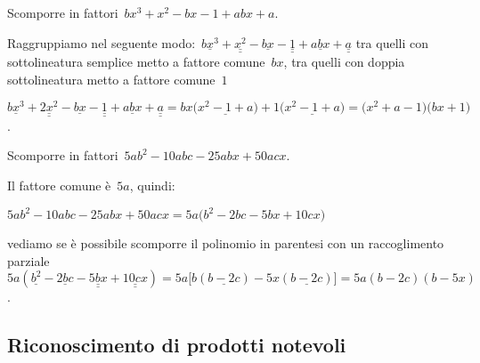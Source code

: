  \begin{esempio}
Scomporre in fattori~\(bx^{3}+x^{2}-bx-1+abx+a\).
 \begin{enumeratea}
  \item Raggruppiamo nel seguente 
   modo:~\(\underline{bx^{3}}+\underline{\underline {x^{2}}}-\underline{bx}-
          \underline{\underline{1}}+\underline{abx}+\underline{\underline{a}}\) 
   tra quelli con sottolineatura semplice metto a fattore comune~\(bx\), 
   tra quelli con doppia sottolineatura metto a fattore comune~\(1\)
  \item
   \(\underline{bx^{3}}+\underline{\underline {2x^{2}}}-\underline{bx}-
    \underline{\underline{1}}+\underline{abx}+\underline{\underline{a}}=
    bx\bigl(\underline{x^{2}-1+a}\bigr)+1\bigl(\underline{x^{2}-1+a}\bigr)=
    \bigl(x^{2}+a-1\bigr)\bigl(bx+1\bigr)\).
 \end{enumeratea}
 \end{esempio}

 \begin{esempio}
Scomporre in fattori~\(5ab^{2}-10abc-25abx+50acx\).
 \begin{enumeratea}
  \item Il fattore comune è~\(5a\), quindi:
    \begin{itemize*}
    \item \(5ab^{2}-10abc-25abx+50acx=5a\bigl(b^{2}-2bc-5bx+10cx\bigr)\)
    \end{itemize*}
  \item vediamo se è possibile scomporre il polinomio in parentesi con un 
   raccoglimento parziale~\(5a(\underline{b^{2}}-\underline{2bc}
     -\underline{\underline{5bx}}+\underline{\underline{10cx}})=
     5a\bigl[b(\underline{b-2c})-5x(\underline{b-2c})\bigr]=5a(b-2c)(b-5x)\).
 \end{enumeratea}
 \end{esempio}

% 


\subsection{Riconoscimento di prodotti notevoli}
\label{subsec:divpol_prodnot}

